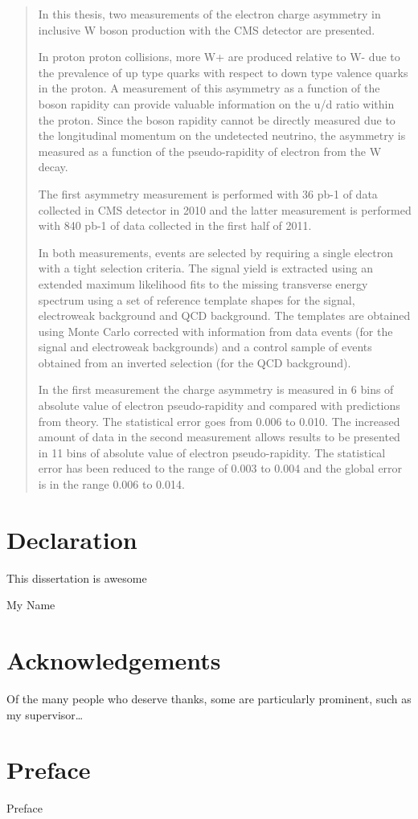 \maketitle

\begin{abstract}
In this thesis, two measurements of the electron charge asymmetry in inclusive W
boson production with the CMS detector are presented. 

In proton proton collisions, more W+ are produced relative to W- due to the
prevalence of up type quarks with respect to down type valence quarks in the
proton. A measurement of this asymmetry as a function of the boson rapidity can
provide valuable information on the u/d ratio within the proton. Since the boson
rapidity cannot be directly measured due to the longitudinal momentum on the
undetected neutrino, the asymmetry is measured as a function of the
pseudo-rapidity of electron from the W decay.

The first asymmetry measurement is performed with 36 pb-1 of data collected in
CMS detector in 2010 and the latter measurement is performed with 840 pb-1 of
data collected in the first half of 2011.

In both measurements, events are selected by requiring a single electron with a
tight selection criteria. The signal yield is extracted using an extended
maximum likelihood fits to the missing transverse energy spectrum using a set of
reference template shapes for the signal, electroweak background and QCD
background. The templates are obtained using Monte Carlo corrected with
information from data events (for the signal and electroweak backgrounds) and a
control sample of events obtained from an inverted selection (for the QCD
background).

In the first measurement the charge asymmetry is measured in 6 bins of absolute
value of electron pseudo-rapidity and compared with predictions from theory. The
statistical error goes from 0.006 to 0.010. The increased amount of data in the
second measurement allows results to be presented in 11 bins of absolute value
of electron pseudo-rapidity. The statistical error has been reduced to the range
of 0.003 to 0.004 and the global error is in the range 0.006 to 0.014.
\end{abstract}

\chapter*{Declaration}
\thispagestyle{empty}
  This dissertation is awesome
  \vspace*{1cm}
  \begin{flushright}
    My Name
  \end{flushright}
\clearpage

\chapter*{Acknowledgements}
\thispagestyle{empty}
Of the many people who deserve thanks, some are particularly prominent,
such as my supervisor\dots
\clearpage

\chapter*{Preface}
\thispagestyle{empty}
Preface
\clearpage

\listoftodos

\tableofcontents

